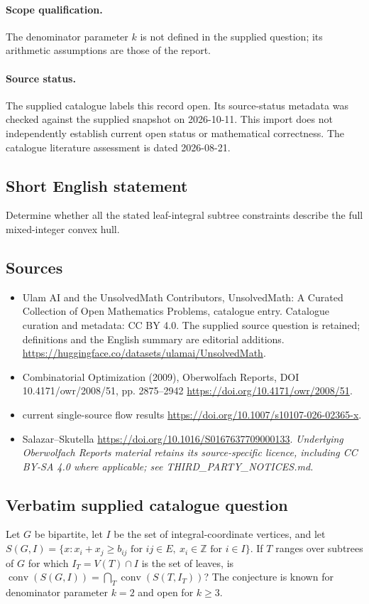 \documentclass[11pt]{article}
\begin{document}
\paragraph{Scope qualification.}
The denominator parameter $k$ is not defined in the supplied question; its arithmetic assumptions are those of the report.
\paragraph{Source status.}
The supplied catalogue labels this record open. Its source-status metadata was checked against the supplied snapshot on 2026-10-11. This import does not independently establish current open status or mathematical correctness. The catalogue literature assessment is dated 2026-08-21.
\subsection{Short English statement}
Determine whether all the stated leaf-integral subtree constraints describe the full mixed-integer convex hull.
\subsection{Sources}
\begin{itemize}
\item[S1] Ulam AI and the UnsolvedMath Contributors, UnsolvedMath: A Curated Collection of Open Mathematics Problems, catalogue entry. Catalogue curation and metadata: CC BY 4.0. The supplied source question is retained; definitions and the English summary are editorial additions.
\url{https://huggingface.co/datasets/ulamai/UnsolvedMath}.
\item[S2] Combinatorial Optimization (2009), Oberwolfach Reports, DOI 10.4171/owr/2008/51, pp. 2875--2942
\url{https://doi.org/10.4171/owr/2008/51}.
\item[S3] current single-source flow results
\url{https://doi.org/10.1007/s10107-026-02365-x}.
\item[S4] Salazar--Skutella
\url{https://doi.org/10.1016/S0167637709000133}.
\textit{Underlying Oberwolfach Reports material retains its source-specific licence, including CC BY-SA 4.0 where applicable; see THIRD\_PARTY\_NOTICES.md.}
\end{itemize}
\subsection{Verbatim supplied catalogue question}
Let $G$ be bipartite, let $I$ be the set of integral-coordinate vertices, and let $S(G,I)=\{x:x_i+x_j\geq b_{ij}\text{ for }ij\in E,\ x_i\in\mathbb{Z}\text{ for }i\in I\}$. If $T$ ranges over subtrees of $G$ for which $I_T=V(T)\cap I$ is the set of leaves, is $\operatorname{conv}(S(G,I))=\bigcap_T\operatorname{conv}(S(T,I_T))$? The conjecture is known for denominator parameter $k=2$ and open for $k\geq3$.
\end{document}
